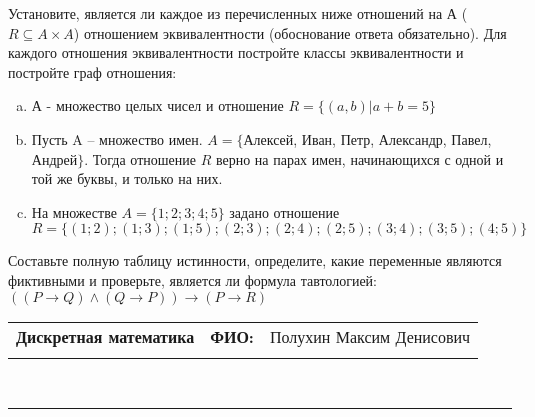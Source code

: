 \documentclass[10pt]{exam}
\newcommand{\class}{Дискретная математика}
\newcommand{\examdate}{}
\begin{document}
\begin{questions}
\question
Установите, является ли каждое из перечисленных ниже отношений на А ($R \subseteq A \times A$) отношением эквивалентности (обоснование ответа обязательно). Для каждого отношения эквивалентности постройте классы 
эквивалентности и постройте граф отношения:
\begin{enumerate} [a)]\setcounter{enumi}{0}
\item А - множество целых чисел и отношение $R = \{(a,b)|a + b = 5\}$
\item Пусть A – множество имен. $A = \{ $Алексей, Иван, Петр, Александр, Павел, Андрей$ \}$. Тогда отношение $R $ верно на парах имен, начинающихся с одной и той же буквы, и только на них.
\item На множестве $A = \{1; 2; 3; 4; 5\}$ задано отношение $R = \{(1; 2); (1; 3); (1; 5); (2; 3); (2; 4); (2; 5); (3; 4); (3; 5); (4; 5)\}$
\end{enumerate}\question Составьте полную таблицу истинности, определите, какие переменные являются фиктивными и проверьте, является ли формула тавтологией:
$(( P \rightarrow Q) \land (Q \rightarrow P)) \rightarrow (P \rightarrow R)$

\end{questions}
\newpage
\begin{flushright}
\begin{tabular}{p{2.8in} r l}
\textbf{\class} & \textbf{ФИО:} &Полухин Максим Денисович
\\

\textbf{\examdate} &&\\
\end{tabular}\\
\end{flushright}
\rule[1ex]{\textwidth}{.1pt}
\end{document}
